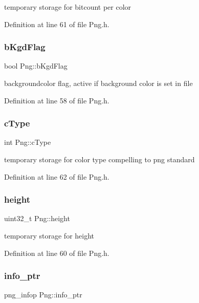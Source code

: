 temporary storage for bitcount per color 

Definition at line 61 of file Png.\+h.

\mbox{\label{classPng_ae40f44717df30fac8de85a5c9fa429d6}} 
\subsubsection{\texorpdfstring{bKgdFlag}{bKgdFlag}}
{\footnotesize\ttfamily bool Png\+::b\+Kgd\+Flag\hspace{0.3cm}{\ttfamily [private]}}

backgroundcolor flag, active if background color is set in file 

Definition at line 58 of file Png.\+h.

\mbox{\label{classPng_ae8acde4e85d5da0271325abfabb8a24c}} 
\subsubsection{\texorpdfstring{cType}{cType}}
{\footnotesize\ttfamily int Png\+::c\+Type\hspace{0.3cm}{\ttfamily [private]}}

temporary storage for color type compelling to png standard 

Definition at line 62 of file Png.\+h.

\mbox{\label{classPng_a46412756311804d40e8e8bf62633e40f}} 
\subsubsection{\texorpdfstring{height}{height}}
{\footnotesize\ttfamily uint32\+\_\+t Png\+::height\hspace{0.3cm}{\ttfamily [private]}}

temporary storage for height 

Definition at line 60 of file Png.\+h.

\mbox{\label{classPng_a33d2aad2ce8332b520bab0842ba7d5d9}} 
\subsubsection{\texorpdfstring{info\_ptr}{info\_ptr}}
{\footnotesize\ttfamily png\+\_\+infop Png\+::info\+\_\+ptr\hspace{0.3cm}{\ttfamily [private]}}

